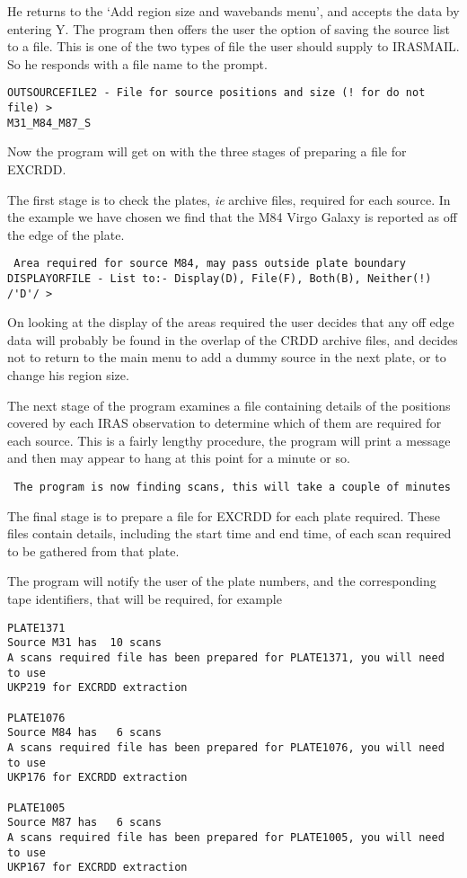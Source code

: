 \documentclass[twoside,11pt]{article}
\begin{document}
He returns to the `Add region size and wavebands menu', and accepts the data by
entering Y. The program then offers the user the option of saving the source
list to a file. This is one of the two types of file the user should supply to
IRASMAIL. So he responds with a file name to the prompt.

\begin{verbatim}
OUTSOURCEFILE2 - File for source positions and size (! for do not file) >
M31_M84_M87_S
\end{verbatim}

Now the program will get on with the three stages of preparing a file for
EXCRDD.

The first stage is to check the plates, {\it ie} archive files, required for
each source. In the example we have chosen we find that the M84 Virgo Galaxy is
reported as off the edge of the plate. 

\begin{verbatim}
 Area required for source M84, may pass outside plate boundary
DISPLAYORFILE - List to:- Display(D), File(F), Both(B), Neither(!) /'D'/ > 
\end{verbatim}

On looking at the display of the areas required the user decides that any
off edge data will probably be found in the overlap of the CRDD archive files,
and decides not to return to the main menu to add a dummy source in the
next plate, or to change his region size.

The next stage of the program examines a file containing details of the
positions covered by each IRAS observation to determine which of them are
required for each source. This is a fairly lengthy procedure, the program will
print a message and then may appear to hang at this point for a minute or so.

\begin{verbatim}
 The program is now finding scans, this will take a couple of minutes
\end{verbatim}

The final stage is to prepare a file for EXCRDD for each plate required. These
files contain details, including the start time and end time, of each scan
required to be gathered from that plate.

The program will notify the user of the plate numbers, and the corresponding
tape identifiers, that will be required, for example

\begin{verbatim}
PLATE1371
Source M31 has  10 scans
A scans required file has been prepared for PLATE1371, you will need to use
UKP219 for EXCRDD extraction

PLATE1076
Source M84 has   6 scans
A scans required file has been prepared for PLATE1076, you will need to use
UKP176 for EXCRDD extraction

PLATE1005
Source M87 has   6 scans
A scans required file has been prepared for PLATE1005, you will need to use
UKP167 for EXCRDD extraction
\end{verbatim}
\end{document}
